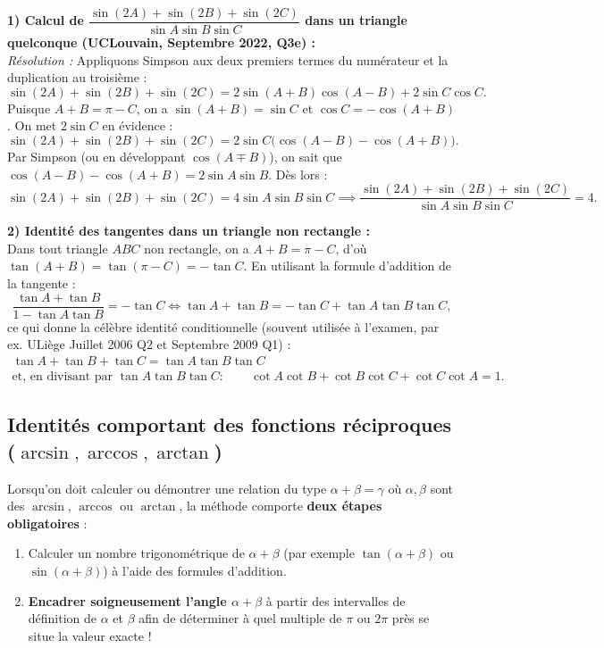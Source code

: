 \begin{exemple}
\textbf{1) Calcul de $\dfrac{\sin(2A) + \sin(2B) + \sin(2C)}{\sin A \sin B \sin C}$ dans un triangle quelconque (UCLouvain, Septembre 2022, Q3e) :}\\
\emph{Résolution :} Appliquons Simpson aux deux premiers termes du numérateur et la duplication au troisième :
\[
    \sin(2A) + \sin(2B) + \sin(2C) = 2\sin(A+B)\cos(A-B) + 2\sin C \cos C.
\]
Puisque $A+B = \pi - C$, on a $\sin(A+B) = \sin C$ et $\cos C = -\cos(A+B)$. On met $2\sin C$ en évidence :
\[
    \sin(2A) + \sin(2B) + \sin(2C) = 2\sin C\bigl(\cos(A-B) - \cos(A+B)\bigr).
\]
Par Simpson (ou en développant $\cos(A\mp B)$), on sait que $\cos(A-B) - \cos(A+B) = 2\sin A \sin B$. Dès lors :
\[
    \sin(2A) + \sin(2B) + \sin(2C) = 4\sin A \sin B \sin C \implies \frac{\sin(2A) + \sin(2B) + \sin(2C)}{\sin A \sin B \sin C} = \boxed{4}.
\]

\medskip
\textbf{2) Identité des tangentes dans un triangle non rectangle :}\\
Dans tout triangle $ABC$ non rectangle, on a $A+B = \pi - C$, d'où $\tan(A+B) = \tan(\pi-C) = -\tan C$. En utilisant la formule d'addition de la tangente :
\[
    \frac{\tan A + \tan B}{1 - \tan A \tan B} = -\tan C \iff \tan A + \tan B = -\tan C + \tan A \tan B \tan C,
\]
ce qui donne la célèbre identité conditionnelle (souvent utilisée à l'examen, par ex. ULiège Juillet 2006 Q2 et Septembre 2009 Q1) :
\begin{align*}
    \boxed{\tan A + \tan B + \tan C = \tan A \tan B \tan C} \\[4pt]
    \text{et, en divisant par } \tan A \tan B \tan C : \qquad \boxed{\cot A \cot B + \cot B \cot C + \cot C \cot A = 1}.
\end{align*}
\end{exemple}

\subsection{Identités comportant des fonctions réciproques ($\arcsin, \arccos, \arctan$)}

Lorsqu'on doit calculer ou démontrer une relation du type $\alpha + \beta = \gamma$ où $\alpha, \beta$ sont des $\arcsin$, $\arccos$ ou $\arctan$, la méthode comporte \textbf{deux étapes obligatoires} :
\begin{enumerate}
    \item Calculer un nombre trigonométrique de $\alpha + \beta$ (par exemple $\tan(\alpha+\beta)$ ou $\sin(\alpha+\beta)$) à l'aide des formules d'addition.
    \item \textbf{Encadrer soigneusement l'angle $\alpha + \beta$} à partir des intervalles de définition de $\alpha$ et $\beta$ afin de déterminer à quel multiple de $\pi$ ou $2\pi$ près se situe la valeur exacte !
\end{enumerate}

